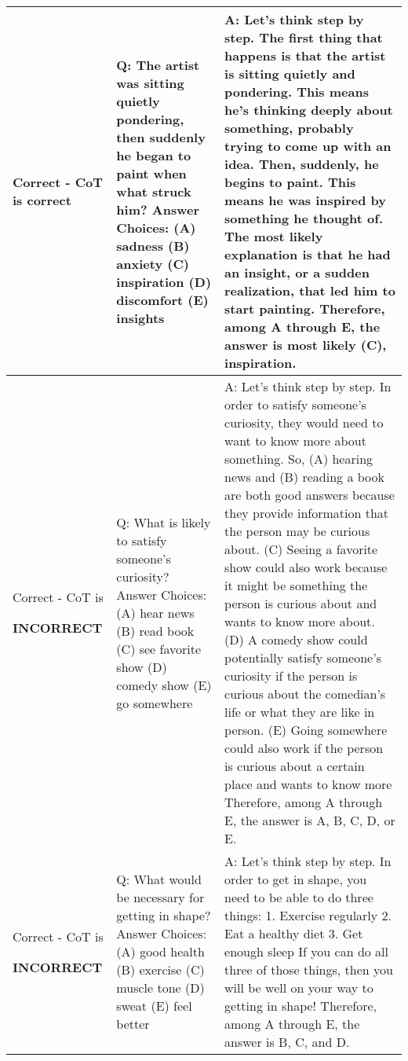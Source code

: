 \documentclass{article}
\newcommand{\theirsz}{Zero-shot\xspace}
\newcommand{\okmark}{{\textbf{\textcolor[rgb]{0.1, 0.5, 0.1}{}}}}
\newcommand{\bblue}[1]{{\textbf{\color{blue}{#1}}}}
\newcommand{\bred}[1]{{\textbf{\color{red}{#1}}}}
\begin{document}
\begin{center}
\begin{longtable}{|p{}|p{}|p{}|}
\midrule



Correct - CoT is correct &Q: The artist was sitting quietly pondering, then suddenly he began to paint when what struck him? Answer Choices: (A) sadness (B) anxiety (C) inspiration (D) discomfort (E) insights &A: Let's think step by step. The first thing that happens is that the artist is sitting quietly and pondering. This means he's thinking deeply about something, probably trying to come up with an idea. Then, suddenly, he begins to paint. This means he was inspired by something he thought of. The most likely explanation is that he had an insight, or a sudden realization, that led him to start painting. Therefore, among A through E, the answer is most likely (C), inspiration. \okmark \\

\midrule

Correct - CoT is \par \textbf{INCORRECT} &Q: What is likely to satisfy someone's curiosity? Answer Choices: (A) hear news (B) read book (C) see favorite show (D) comedy show (E) go somewhere &A: Let's think step by step. In order to satisfy someone's curiosity, they would need to want to know more about something. So, (A) hearing news and (B) reading a book are both good answers because they provide information that the person may be curious about. (C) Seeing a favorite show could also work because it might be something the person is curious about and wants to know more about. (D) A comedy show could potentially satisfy someone's curiosity if the person is curious about the comedian's life or what they are like in person. (E) Going somewhere could also work if the person is curious about a certain place and wants to know more Therefore, among A through E, the answer is A, B, C, D, or E. \okmark \bred{(Model cannot choose only one.)} \bblue{(GT : (A), \theirsz : (E))} \\

\midrule

Correct - CoT is \par \textbf{INCORRECT} &Q: What would be necessary for getting in shape? Answer Choices: (A) good health (B) exercise (C) muscle tone (D) sweat (E) feel better &A: Let's think step by step. In order to get in shape, you need to be able to do three things: 1. Exercise regularly 2. Eat a healthy diet 3. Get enough sleep If you can do all three of those things, then you will be well on your way to getting in shape! Therefore, among A through E, the answer is B, C, and D. \okmark \bred{(Model cannot choose only one.)} \bblue{(GT : (B), \theirsz : (B))}\\


\end{longtable}
\end{center}
\end{document}
